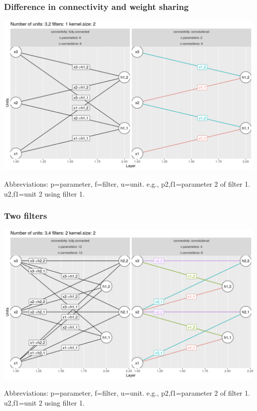 \documentclass{beamer}
\begin{document}
\begin{frame}
  \frametitle{Difference in connectivity and weight sharing}
  \includegraphics[width=\textwidth]{figure-convolutional-filters-3-2-1}

  Abbreviations: p=parameter, f=filter, u=unit.
  e.g., p2,f1=parameter 2 of filter 1. u2,f1=unit 2 using filter 1.
\end{frame}

\begin{frame}
  \frametitle{Two filters}
  \includegraphics[width=\textwidth]{figure-convolutional-filters-3-2-2}
  
  Abbreviations: p=parameter, f=filter, u=unit.
  e.g., p2,f1=parameter 2 of filter 1. u2,f1=unit 2 using filter 1.
\end{frame}
\end{document}
